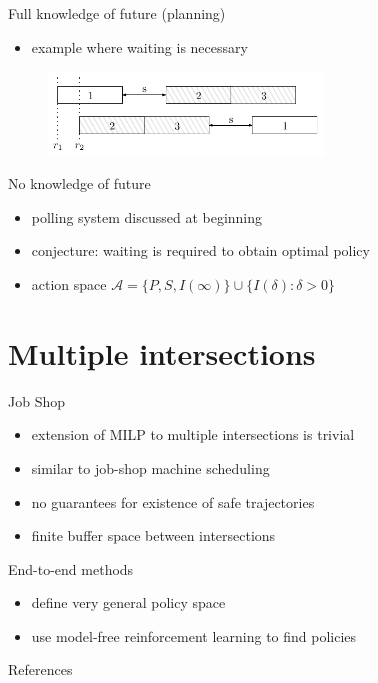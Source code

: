 \documentclass[bigger]{beamer}
\begin{document}
\begin{frame}[label={sec:orgc791cca}]{Full knowledge of future (planning)}
\begin{itemize}
\item example where waiting is necessary
\end{itemize}

\vfill
\begin{figure}[t]
  \centering
  \includegraphics[width=0.65\textwidth]{../figures/123.pdf}
\end{figure}
\end{frame}
\begin{frame}[label={sec:org15d2608}]{No knowledge of future}
\begin{itemize}
\item polling system discussed at beginning
\item conjecture: waiting is required to obtain optimal policy
\item action space \(\mathcal{A} = \{P,S,I(\infty)\} \cup \{I(\delta) : \delta > 0\}\)
\end{itemize}
\end{frame}
\section{Multiple intersections}
\label{sec:orga680cc9}

\begin{frame}[label={sec:orga24ea9f}]{Job Shop}
\begin{itemize}
\item extension of MILP to multiple intersections is trivial
\item similar to job-shop machine scheduling
\item no guarantees for existence of safe trajectories
\item finite buffer space between intersections
\end{itemize}
\end{frame}
\begin{frame}[label={sec:org93d50de}]{End-to-end methods}
\begin{itemize}
\item define very general policy space
\item use model-free reinforcement learning to find policies
\end{itemize}
\end{frame}
\begin{frame}[label={sec:org2727cf1}]{References}
\begingroup
\renewcommand{\section}[2]{}


\endgroup

\(\;\)
\end{frame}
\end{document}
